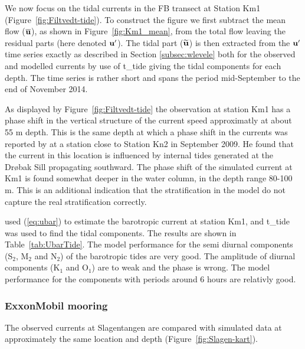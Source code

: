 We now focus on the tidal currents in the FB transect at Station Km1 (Figure~\ref{fig:Filtvedt-tide}). To construct the figure we first subtract the mean flow ($\overline{\mathbf{u}}$), as shown in Figure~\ref{fig:Km1_mean}, from the total flow leaving the residual parts (here denoted $\mathbf{u}'$). The tidal part ($\widetilde{\mathbf{u}}$) is then extracted from the $\mathbf{u}'$ time series exactly as described in Section \ref{subsec:wlevele} both for the observed and modelled currents by use of t\_tide \cite[]{pavlo:etal:2002} giving the tidal components for each depth. The time series is rather short and spans the period mid-September to the end of November 2014. 

As displayed by Figure~\ref{fig:Filtvedt-tide} the observation at station Km1 has a phase shift in the vertical structure of the current speed approximatly at about 55 m depth. This is the same depth at which a phase shift in the currents was reported by \cite{staal:etal:2012} at a station close to Station Kn2 in September 2009. He found that the current in this location is influenced by internal tides generated at the Dr{\o}bak Sill propagating southward. The phase shift of the simulated current at Km1 is found somewhat deeper in the water column, in the depth range 80-100 m. This is an additional indication that the stratification in the model do not capture the real stratification correctly.

\cite{hjelm:etal:2017} used (\ref{eq:ubar}) to estimate the barotropic current at station Km1, and t\_tide was used to find the tidal components. The results are shown in Table~\ref{tab:UbarTide}. The model performance for the semi diurnal components (S$_2$, M$_2$ and N$_2$) of the barotropic tides are very good. The amplitude of diurnal components (K$_1$ and O$_1$) are to weak and the phase is wrong. The model performance for the components with periods around 6 hours are relativly good.



\clearpage
\subsubsection{ExxonMobil mooring}
\label{subsubsec:slagen}
The observed currents at Slagentangen are compared with simulated data at approximately the same location and depth (Figure~\ref{fig:Slagen-kart}).

